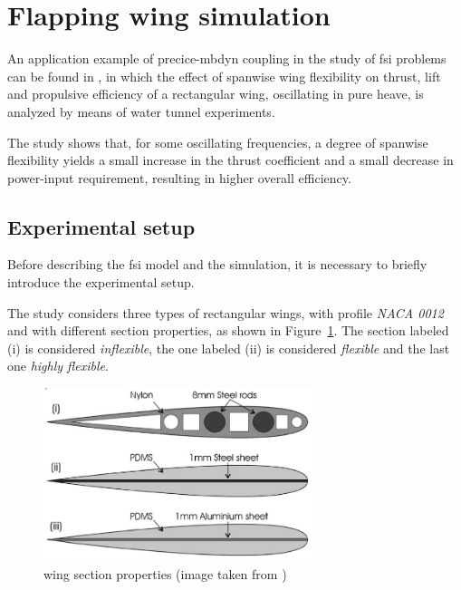 
\section{Flapping wing simulation}
\label{sec:heathcote}

An application example of \acrshort{precice}-\acrshort{mbdyn} coupling in the study of \acrshort{fsi} problems can be found in \cite{heathcote2008effect}, in which the effect of spanwise wing flexibility on thrust, lift and propulsive efficiency of a rectangular wing, oscillating in pure heave, is analyzed by means of water tunnel experiments.

The study shows that, for some oscillating frequencies, a degree of spanwise flexibi\-lity yields a small
increase in the thrust coefficient and a small decrease in power-input requirement, resulting in higher overall efficiency.

\subsection{Experimental setup}

Before describing the \acrshort{fsi} model and the simulation, it is necessary to briefly introduce the experimental setup.

The study considers three types of rectangular wings, with profile \textit{NACA 0012} and with different section properties, as shown in Figure~\ref{fig:profiles0012}. The section labeled (i) is considered \textit{inflexible}, the one labeled (ii) is considered \textit{flexible} and the last one \textit{highly flexible}.

\begin{figure}[htbp!]
	\centering
	\includegraphics[width=0.7\textwidth]{images/profiles0012}
	\caption{wing section properties (image taken from \cite{heathcote2008effect})}
	\label{fig:profiles0012}
\end{figure}

